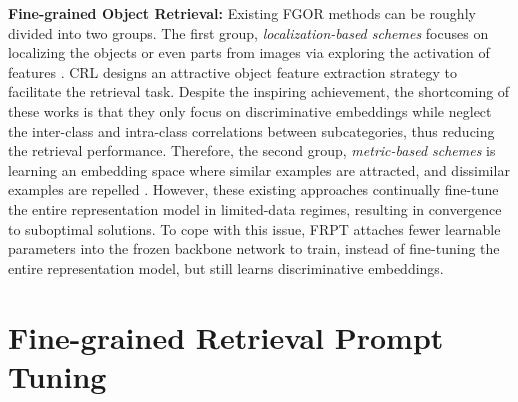 \documentclass[letterpaper]{article} %
\begin{document}
\textbf{Fine-grained Object Retrieval:} Existing FGOR methods can be roughly divided into two groups. The first group, \textit{localization-based schemes} focuses on localizing the objects or even parts from images via exploring the activation of features \cite{DBLP:journals/tip/WeiLWZ17,DBLP:conf/ijcai/ZhengJSWHY18, DBLP:journals/mms/WangWWWL22, DBLP:conf/wacv/MoskvyakMDB21,DBLP:conf/aaai/WangWLO22}. CRL \cite{DBLP:conf/ijcai/ZhengJSWHY18} designs an attractive object feature extraction strategy to facilitate the retrieval task. Despite the inspiring achievement, the shortcoming of these works is that they only focus on discriminative embeddings while neglect the inter-class and intra-class correlations between subcategories, thus reducing the retrieval performance. Therefore, the second group, \textit{metric-based schemes} is learning an embedding space where similar examples are attracted, and dissimilar examples are repelled \cite{DBLP:conf/eccv/TehDT20,DBLP:conf/cvpr/WangHHDS19,DBLP:conf/eccv/BoudiafRZGPPA20, DBLP:conf/iccv/KoGK21, DBLP:conf/icml/RothMOCG21, DBLP:conf/iccv/ZhengZL021}. %
However, these existing approaches continually fine-tune the entire representation model in limited-data regimes, resulting in convergence to suboptimal solutions. To cope with this issue, FRPT attaches fewer learnable parameters into the frozen backbone network to train, instead of fine-tuning the entire representation model, but still learns discriminative embeddings.

\section{Fine-grained Retrieval Prompt Tuning}
 
\end{document}

